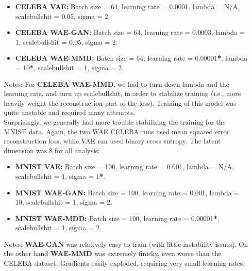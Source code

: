 \documentclass[12pt,english]{amsart}
\begin{document}
\begin{itemize}

    \item{\textbf{CELEBA VAE:} Batch size = 64, learning rate = 0.0001,
          lambda = N/A, scalebullshit = 0.05, sigma = 2.}

    \item{\textbf{CELEBA WAE-GAN:} Batch size = 64, learning rate = 0.0003,
          lambda = 1, scalebullshit = 0.05, sigma = 2.}

    \item{\textbf{CELEBA WAE-MMD:} Batch size = 64,
          learning rate = 0.00001\textbf{*}, lambda = 10\textbf{*},
          scalebullshit = 1, sigma = 2.}

\end{itemize}

Notes: For \textbf{CELEBA WAE-MMD}, we had to turn down lambda and the learning
rate, and turn up scalebullshit, in order to stabilize training (i.e., more
heavily weight the reconstruction part of the loss). Training of this model was
quite unstable and required many attempts. \\

Surprisingly, we generally had more trouble stabilizing the training for the
MNIST data. Again, the two WAE CELEBA runs used mean squared error
reconstruction loss, while VAE run used binary cross entropy. The latent
dimension was 8 for all analysis: \\

\begin{itemize}
    \item{\textbf{MNIST VAE:} Batch size = 100, learning rate = 0.001,
          lambda = N/A, scalebullshit = 1, sigma = 1\textbf{*}.} \\

    \item{\textbf{MNIST WAE-GAN:} Batch size = 100, learning rate = 0.001,
          lambda = 10, scalebullshit = 1, sigma = 2.} \\

    \item{\textbf{MNIST WAE-MDD:} Batch size = 100,
          learning rate = 0.00001\textbf{*}, scalebullshit = 1, sigma = 2.} \\

\end{itemize}

Notes: \textbf{WAE-GAN}  was relatively easy to train (with little instability
issues). On the other hand \textbf{WAE-MMD} was extremely finicky, even worse
than the CELEBA dataset. Gradients easily exploded, requiring very small
learning rates. \\
\end{document}

